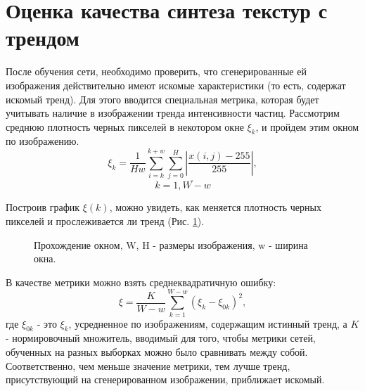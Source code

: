 \clearpage
\section{Оценка качества синтеза текстур с трендом}
	После обучения сети, необходимо проверить, что сгенерированные ей изображения действительно имеют искомые характеристики (то есть, содержат искомый тренд). Для этого вводится специальная метрика, которая будет учитывать наличие в изображении тренда интенсивности частиц. Рассмотрим среднюю плотность черных пикселей в некотором окне $\xi_k$, и пройдем этим окном по изображению.
	$$\xi_k = \frac{1}{H w}{\sum_{i=k}^{k+w} \sum_{j=0}^{H}\left| \frac{x(i, j) - 255}{255} \right|}, $$$$k = \overline{1, W - w} $$
	
	Построив график $\xi(k)$, можно увидеть, как меняется плотность черных пикселей и прослеживается ли тренд (Рис. \ref{7-window}).
	
	\begin{figure}[h!]
		\caption{Прохождение окном, W, H - размеры изображения, w - ширина окна.}
		\label{7-window}
	\end{figure}
	
	В качестве метрики можно взять среднеквадратичную ошибку:
	$$ \xi = \frac{K}{W-w}\sum_{k=1}^{W-w} (\xi_k - \xi_{0k})^2,$$
	где $\xi_{0k}$ - это $\xi_k$, усредненное по изображениям, содержащим истинный тренд, а $K$ - нормировочный множитель, вводимый для того, чтобы метрики сетей, обученных на разных выборках можно было сравнивать между собой. Соответственно, чем меньше значение метрики, тем лучше тренд, присутствующий на сгенерированном изображении, приближает искомый.